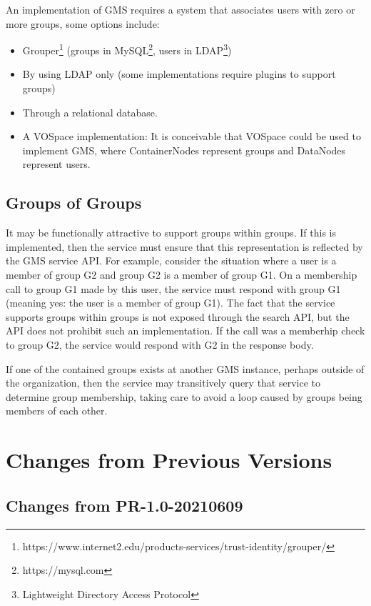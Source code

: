 \documentclass[11pt,a4paper]{ivoa}
\begin{document}
An implementation of GMS requires a system that associates users with zero or more groups, some options include:

\begin{itemize}
\item Grouper\footnote{https://www.internet2.edu/products-services/trust-identity/grouper/} (groups in MySQL\footnote{https://mysql.com}, users in LDAP\footnote{Lightweight Directory Access Protocol})
\item By using LDAP only (some implementations require plugins to support groups)
\item Through a relational database.
\item A VOSpace implementation: It is conceivable that VOSpace could be used to implement GMS, where ContainerNodes represent groups and DataNodes represent users.
\end{itemize}

\subsection{Groups of Groups}
\label{subsec:groupsofgroups}

It may be functionally attractive to support groups within groups.  If this is implemented, then the service must ensure that this representation is reflected by the GMS service API.  For example, consider the situation where a user is a member of group G2 and group G2 is a member of group G1.  On a membership call to group G1 made by this user, the service must respond with group G1 (meaning yes: the user is a member of group G1).  The fact that the service supports groups within groups is not exposed through the search API, but the API does not prohibit such an implementation.  If the call was a memberhip check to group G2, the service would respond with G2 in the response body.

If one of the contained groups exists at another GMS instance, perhaps outside of the organization, then the service may transitively query that service to determine group membership, taking care to avoid a loop caused by groups being members of each other.


\appendix

\section{Changes from Previous Versions}
\label{sec:changehistory}

\subsection{Changes from PR-1.0-20210609}
\end{document}
